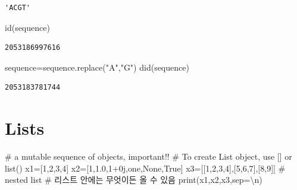 \documentclass[
  a4paper,
  DIV=11,
  numbers=noendperiod]{scrreprt}
\newenvironment{Shaded}{\begin{snugshade}}{\end{snugshade}}
\newcommand{\BuiltInTok}[1]{\textcolor[rgb]{0.00,0.23,0.31}{#1}}
\newcommand{\CharTok}[1]{\textcolor[rgb]{0.13,0.47,0.30}{#1}}
\newcommand{\CommentTok}[1]{\textcolor[rgb]{0.37,0.37,0.37}{#1}}
\newcommand{\DecValTok}[1]{\textcolor[rgb]{0.68,0.00,0.00}{#1}}
\newcommand{\FloatTok}[1]{\textcolor[rgb]{0.68,0.00,0.00}{#1}}
\newcommand{\NormalTok}[1]{\textcolor[rgb]{0.00,0.23,0.31}{#1}}
\newcommand{\OperatorTok}[1]{\textcolor[rgb]{0.37,0.37,0.37}{#1}}
\newcommand{\OtherTok}[1]{\textcolor[rgb]{0.00,0.23,0.31}{#1}}
\newcommand{\StringTok}[1]{\textcolor[rgb]{0.13,0.47,0.30}{#1}}
\newcommand{\VariableTok}[1]{\textcolor[rgb]{0.07,0.07,0.07}{#1}}
\begin{document}
\begin{verbatim}
'ACGT'
\end{verbatim}

\begin{Shaded}
\begin{Highlighting}[]
\BuiltInTok{id}\NormalTok{(sequence)}
\end{Highlighting}
\end{Shaded}

\begin{verbatim}
2053186997616
\end{verbatim}

\begin{Shaded}
\begin{Highlighting}[]
\NormalTok{sequence}\OperatorTok{=}\NormalTok{sequence.replace(}\StringTok{"A"}\NormalTok{,}\StringTok{"G"}\NormalTok{)}
\NormalTok{did(sequence)}
\end{Highlighting}
\end{Shaded}

\begin{verbatim}
2053183781744
\end{verbatim}

\section{Lists}\label{lists}

\begin{Shaded}
\begin{Highlighting}[]
\CommentTok{\# a mutable sequence of objects, important!!}
\CommentTok{\# To create List object, use [] or list()}
\NormalTok{x1}\OperatorTok{=}\NormalTok{[}\DecValTok{1}\NormalTok{,}\DecValTok{2}\NormalTok{,}\DecValTok{3}\NormalTok{,}\DecValTok{4}\NormalTok{]}
\NormalTok{x2}\OperatorTok{=}\NormalTok{[}\DecValTok{1}\NormalTok{,}\FloatTok{1.0}\NormalTok{,}\DecValTok{1}\OperatorTok{+}\OtherTok{0j}\NormalTok{,}\StringTok{\textquotesingle{}one\textquotesingle{}}\NormalTok{,}\VariableTok{None}\NormalTok{,}\VariableTok{True}\NormalTok{]}
\NormalTok{x3}\OperatorTok{=}\NormalTok{[[}\DecValTok{1}\NormalTok{,}\DecValTok{2}\NormalTok{,}\DecValTok{3}\NormalTok{,}\DecValTok{4}\NormalTok{],[}\DecValTok{5}\NormalTok{,}\DecValTok{6}\NormalTok{,}\DecValTok{7}\NormalTok{],[}\DecValTok{8}\NormalTok{,}\DecValTok{9}\NormalTok{]] }\CommentTok{\# nested list}
\CommentTok{\# 리스트 안에는 무엇이든 올 수 있음}
\BuiltInTok{print}\NormalTok{(x1,x2,x3,sep}\OperatorTok{=}\StringTok{\textquotesingle{}}\CharTok{\textbackslash{}n}\StringTok{\textquotesingle{}}\NormalTok{)}
\end{Highlighting}
\end{Shaded}
\end{document}
